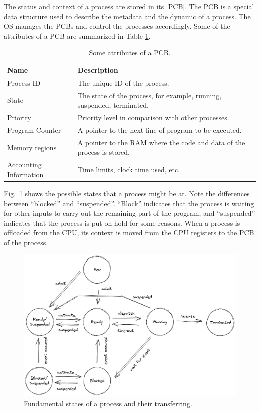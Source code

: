 The status and context of a process are stored in its [PCB]. The PCB is a special data structure used to describe the metadata and the dynamic of a process. The OS manages the PCBs and control the processes accordingly. Some of the attributes of a PCB are summarized in Table \ref{ch:pm:tab:pcbcontent}.

\begin{table}[!htb]
	\centering \caption{Some attributes of a PCB.}\label{ch:pm:tab:pcbcontent}
	\begin{tabularx}{\textwidth}{lX}
		\hline
		Name & Description \\ \hline
		Process ID & The unique ID of the process.  \\
		State & The state of the process, for example, running, suspended, terminated.  \\
		Priority & Priority level in comparison with other processes. \\
		Program Counter & A pointer to the next line of program to be executed. \\
		Memory regions & A pointer to the RAM where the code and data of the process is stored. \\
		Accounting Information & Time limits, clock time used, etc. \\ \hline
	\end{tabularx}
\end{table}

Fig.~\ref{ch:pm:fig:processstatetransfer} shows the possible states that a process might be at. Note the differences between ``blocked'' and ``suspended''. ``Block'' indicates that the process is waiting for other inputs to carry out the remaining part of the program, and ``suspended'' indicates that the process is put on hold for some reasons. When a process is offloaded from the CPU, its context is moved from the CPU registers to the PCB of the process.

\begin{figure}[!htb]
	\centering
	\includegraphics[width=350pt]{chapters/part-1/figures/processstatetransfer.png}
	\caption{Fundamental states of a process and their transferring.} \label{ch:pm:fig:processstatetransfer}
\end{figure}

